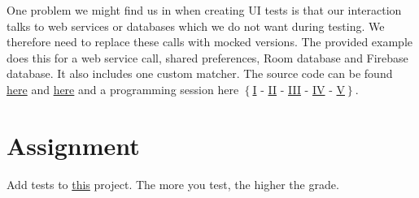 One problem we might find us in when creating UI tests is that our interaction talks to web services or databases which we do not want during testing. We therefore need to replace these calls with mocked versions. The provided example does this for a web service call, shared preferences, Room database and Firebase database. It also includes one custom matcher. The source code can be found \href{https://github.com/JonSteinn/AndroidDevelopment/tree/master/examples/lab6/espressotest}{here} and \href{https://github.com/JonSteinn/AndroidDevelopment/tree/master/examples/lab6/espressoextra}{here} and a programming session here $\left\{\right.$\href{https://www.youtube.com/watch?v=RW19LV9FG7w}{I} - \href{https://www.youtube.com/watch?v=pxdfimd4MDc}{II} - \href{https://www.youtube.com/watch?v=0OZ_MXSq_OE}{III} - \href{https://www.youtube.com/watch?v=dAdKmsSJB_8}{IV} - \href{https://www.youtube.com/watch?v=G4uXh-SBYIU}{V}$\left.\right\}$.


\section{Assignment}
Add tests to \href{https://github.com/JonSteinn/AndroidDevelopment/raw/master/examples/lab6/test_template.zip}{this} project. The more you test, the higher the grade.
